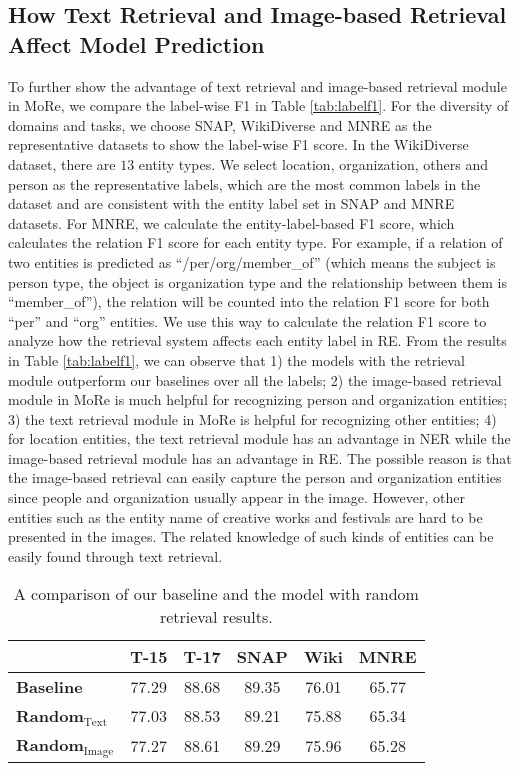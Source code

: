 \documentclass[11pt]{article}
\begin{document}
\subsection{How Text Retrieval and Image-based Retrieval Affect Model Prediction}
To further show the advantage of text retrieval and image-based retrieval module in MoRe, we compare the label-wise F1 in Table \ref{tab:labelf1}. For the diversity of domains and tasks, we choose SNAP, WikiDiverse and MNRE as the representative datasets to show the label-wise F1 score. In the WikiDiverse dataset, there are $13$ entity types. We select location, organization, others and person as the representative labels, which are the most common labels in the dataset and are consistent with the entity label set in SNAP and MNRE datasets. For MNRE, we calculate the entity-label-based F1 score, which calculates the relation F1 score for each entity type. For example, if a relation of two entities is predicted as ``/per/org/member\_of'' (which means the subject is person type, the object is organization type and the relationship between them is ``member\_of''), the relation will be counted into the relation F1 score for both ``per'' and ``org'' entities. We use this way to calculate the relation F1 score to analyze how the retrieval system affects each entity label in RE. From the results in Table \ref{tab:labelf1}, we can observe that 1) the models with the retrieval module outperform our baselines over all the labels; 2) the image-based retrieval module in MoRe is much helpful for recognizing person and organization entities; 3) the text retrieval module in MoRe is helpful for recognizing other entities; 4) for location entities, the text retrieval module has an advantage in NER while the image-based retrieval module has an advantage in RE. The possible reason is that the image-based retrieval can easily capture the person and organization entities since people and organization usually appear in the image. However, other entities such as the entity name of creative works and festivals are hard to be presented in the images. The related knowledge of such kinds of entities can be easily found through text retrieval. 

\begin{table}[t!]
\small
\setlength\tabcolsep{4pt}
\centering
\begin{tabular}{l|ccccc}
\toprule
& T-15 & T-17 & SNAP  & Wiki & MNRE    \\
\midrule
\textbf{Baseline}      & 77.29 & 88.68 & 89.35 & 76.01 & 65.77 \\
\textbf{Random}$_{\text{Text}}$  & 77.03 & 88.53 & 89.21 & 75.88 & 65.34 \\
\textbf{Random}$_{\text{Image}}$ & 77.27 & 88.61 & 89.29 & 75.96 & 65.28 \\
\bottomrule
\end{tabular}
\caption{A comparison of our baseline and the model with random retrieval results.}
\label{tab:random}
\end{table}
\end{document}
